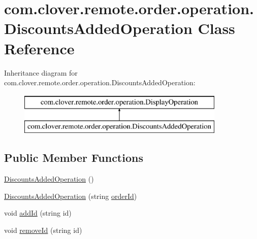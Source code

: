 \hypertarget{classcom_1_1clover_1_1remote_1_1order_1_1operation_1_1_discounts_added_operation}{}\section{com.\+clover.\+remote.\+order.\+operation.\+Discounts\+Added\+Operation Class Reference}
\label{classcom_1_1clover_1_1remote_1_1order_1_1operation_1_1_discounts_added_operation}
Inheritance diagram for com.\+clover.\+remote.\+order.\+operation.\+Discounts\+Added\+Operation\+:\begin{figure}[H]
\begin{center}
\leavevmode
\includegraphics[height=2.000000cm]{classcom_1_1clover_1_1remote_1_1order_1_1operation_1_1_discounts_added_operation}
\end{center}
\end{figure}
\subsection*{Public Member Functions}
\begin{DoxyCompactItemize}
\item 
\hyperlink{classcom_1_1clover_1_1remote_1_1order_1_1operation_1_1_discounts_added_operation_a7fdd603245a95a6e40fa91263dd5f560}{Discounts\+Added\+Operation} ()
\item 
\hyperlink{classcom_1_1clover_1_1remote_1_1order_1_1operation_1_1_discounts_added_operation_aeea6c594585c1d48382b4b51ee40eac2}{Discounts\+Added\+Operation} (string \hyperlink{classcom_1_1clover_1_1remote_1_1order_1_1operation_1_1_discounts_added_operation_a26508f0e0f75902bd4f348b74a831c8b}{order\+Id})
\item 
void \hyperlink{classcom_1_1clover_1_1remote_1_1order_1_1operation_1_1_discounts_added_operation_acbfeb2a5687ddb9184b13a64cefbc90c}{add\+Id} (string id)
\item 
void \hyperlink{classcom_1_1clover_1_1remote_1_1order_1_1operation_1_1_discounts_added_operation_aa1ed76c21fcd8addc3778371e4247f35}{remove\+Id} (string id)
\end{DoxyCompactItemize}
